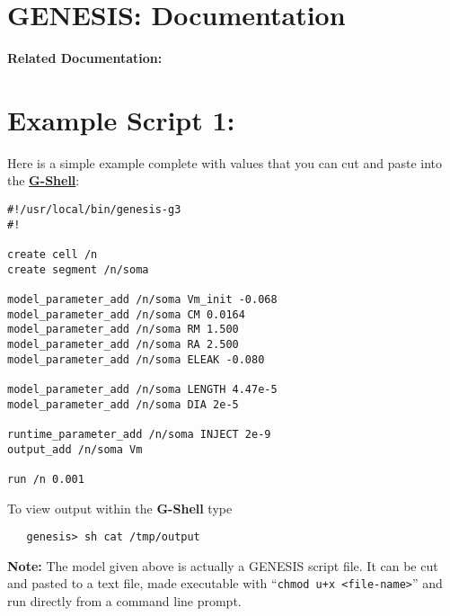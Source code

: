 \documentclass[12pt]{article}
\begin{document}
\section*{GENESIS: Documentation}

{\bf Related Documentation:}

\section*{Example Script 1:}

Here is a simple example complete with values that you can cut and paste into the \href{../gshell/gshell.tex}{\bf G-Shell}:

\begin{verbatim}
#!/usr/local/bin/genesis-g3
#!

create cell /n
create segment /n/soma

model_parameter_add /n/soma Vm_init -0.068
model_parameter_add /n/soma CM 0.0164
model_parameter_add /n/soma RM 1.500
model_parameter_add /n/soma RA 2.500
model_parameter_add /n/soma ELEAK -0.080

model_parameter_add /n/soma LENGTH 4.47e-5
model_parameter_add /n/soma DIA 2e-5

runtime_parameter_add /n/soma INJECT 2e-9
output_add /n/soma Vm

run /n 0.001
\end{verbatim}
To view output within the {\bf G-Shell} type
\begin{verbatim}
   genesis> sh cat /tmp/output
\end{verbatim}
{\bf Note:} The model given above is actually a GENESIS script file. It can be cut and pasted to a text file, made executable with ``{\tt chmod u+x <file-name>}'' and run directly from a command line prompt.
\end{document}
